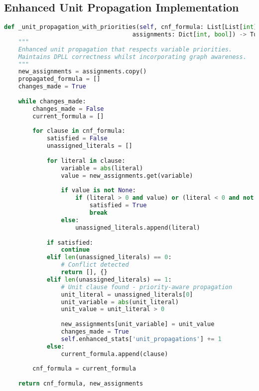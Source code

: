 \subsection{Enhanced Unit Propagation Implementation}
\label{appendix:unit-propagation}

\begin{lstlisting}[language=Python, caption=Unit Propagation with Graph-Aware Optimisations]
def _unit_propagation_with_priorities(self, cnf_formula: List[List[int]], 
                                    assignments: Dict[int, bool]) -> Tuple[List[List[int]], Dict[int, bool]]:
    """
    Enhanced unit propagation that respects variable priorities.
    Maintains DPLL correctness whilst incorporating graph awareness.
    """
    new_assignments = assignments.copy()
    propagated_formula = []
    changes_made = True
    
    while changes_made:
        changes_made = False
        current_formula = []
        
        for clause in cnf_formula:
            satisfied = False
            unassigned_literals = []
            
            for literal in clause:
                variable = abs(literal)
                value = new_assignments.get(variable)
                
                if value is not None:
                    if (literal > 0 and value) or (literal < 0 and not value):
                        satisfied = True
                        break
                else:
                    unassigned_literals.append(literal)
            
            if satisfied:
                continue
            elif len(unassigned_literals) == 0:
                # Conflict detected
                return [], {}
            elif len(unassigned_literals) == 1:
                # Unit clause found - priority-aware propagation
                unit_literal = unassigned_literals[0]
                unit_variable = abs(unit_literal)
                unit_value = unit_literal > 0
                
                new_assignments[unit_variable] = unit_value
                changes_made = True
                self.enhanced_stats['unit_propagations'] += 1
            else:
                current_formula.append(clause)
        
        cnf_formula = current_formula
    
    return cnf_formula, new_assignments
\end{lstlisting}

